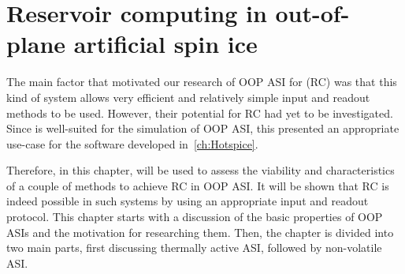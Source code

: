 \chapter{Reservoir computing in out-of-plane artificial spin ice}\label{ch:Applications}

The main factor that motivated our research of OOP ASI for  (RC) was that this kind of system allows very efficient and relatively simple input and readout methods to be used.
However, their potential for RC had yet to be investigated.
Since \hotspice is well-suited for the simulation of OOP ASI, this presented an appropriate use-case for the software developed in~\cref{ch:Hotspice}. \par %
Therefore, in this chapter, \hotspice will be used to assess the viability and characteristics of a couple of methods to achieve RC in OOP ASI.
It will be shown that RC is indeed possible in such systems by using an appropriate input and readout protocol.
This chapter starts with a discussion of the basic properties of OOP ASIs and the motivation for researching them.
Then, the chapter is divided into two main parts, first discussing thermally active ASI, followed by non-volatile ASI.


